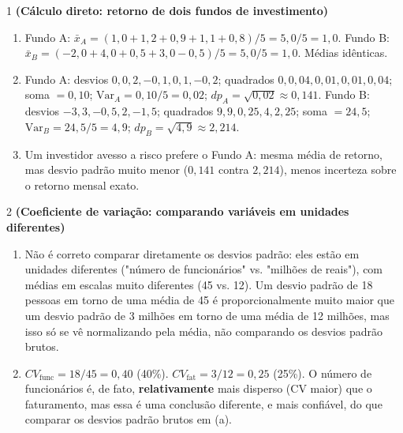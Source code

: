 \documentclass[11pt]{article}
\begin{document}

\begin{questao}{1} \textbf{(Cálculo direto: retorno de dois fundos de investimento)}
\begin{solucao}
\begin{enumerate}[label=(\alph*)]
  \item Fundo A: $\bar x_A = (1{,}0+1{,}2+0{,}9+1{,}1+0{,}8)/5 = 5{,}0/5 = 1{,}0$.
    Fundo B: $\bar x_B = (-2{,}0+4{,}0+0{,}5+3{,}0-0{,}5)/5 = 5{,}0/5 = 1{,}0$. Médias idênticas.
  \item Fundo A: desvios $0, 0{,}2, -0{,}1, 0{,}1, -0{,}2$; quadrados $0, 0{,}04, 0{,}01, 0{,}01,
    0{,}04$; soma $=0{,}10$; $\mathrm{Var}_A = 0{,}10/5=0{,}02$; $dp_A=\sqrt{0{,}02}\approx
    0{,}141$.
    Fundo B: desvios $-3, 3, -0{,}5, 2, -1{,}5$; quadrados $9, 9, 0{,}25, 4, 2{,}25$; soma
    $=24{,}5$; $\mathrm{Var}_B=24{,}5/5=4{,}9$; $dp_B=\sqrt{4{,}9}\approx 2{,}214$.
  \item Um investidor avesso a risco prefere o Fundo A: mesma média de retorno, mas desvio padrão
    muito menor ($0{,}141$ contra $2{,}214$), menos incerteza sobre o retorno mensal exato.
\end{enumerate}
\end{solucao}
\end{questao}

\begin{questao}{2} \textbf{(Coeficiente de variação: comparando variáveis em unidades diferentes)}
\begin{solucao}
\begin{enumerate}[label=(\alph*)]
  \item Não é correto comparar diretamente os desvios padrão: eles estão em unidades diferentes
    ("número de funcionários" vs. "milhões de reais"), com médias em escalas muito diferentes
    (45 vs. 12). Um desvio padrão de 18 pessoas em torno de uma média de 45 é proporcionalmente
    muito maior que um desvio padrão de 3 milhões em torno de uma média de 12 milhões, mas isso
    só se vê normalizando pela média, não comparando os desvios padrão brutos.
  \item $CV_{\text{func}} = 18/45 = 0{,}40$ (40\%). $CV_{\text{fat}} = 3/12 = 0{,}25$ (25\%). O
    número de funcionários é, de fato, \textbf{relativamente} mais disperso (CV maior) que o
    faturamento, mas essa é uma conclusão diferente, e mais confiável, do que comparar os desvios
    padrão brutos em (a).
\end{enumerate}
\end{solucao}
\end{questao}
\end{document}
